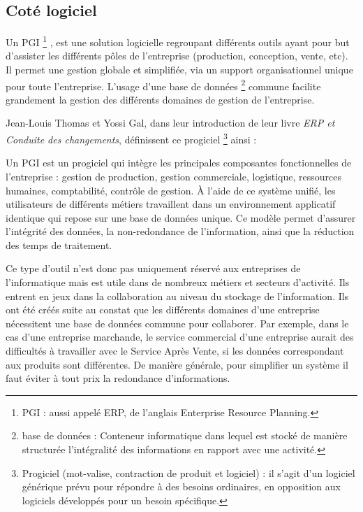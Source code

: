 \subsection{Coté logiciel}

Un \gls{PGI} \footnote{PGI : aussi appelé ERP, de l'anglais Enterprise Resource Planning.} , est une solution logicielle regroupant différents outils ayant pour but d'assister les différents pôles de l'entreprise (production, conception, vente, etc). Il permet une gestion globale et simplifiée, via un support organisationnel unique pour toute l'entreprise. L'usage d'une base de données \footnote{base de données : Conteneur informatique dans lequel est stocké de manière structurée l'intégralité des informations en rapport avec une activité.} commune facilite grandement la gestion des différents domaines de gestion de l'entreprise.

Jean-Louis Thomas et Yossi Gal, dans leur introduction de leur livre \textit{ERP et Conduite des changements}, définissent ce progiciel \footnote{Progiciel (mot-valise, contraction de produit et logiciel) : il s'agit d'un logiciel  générique prévu pour répondre à des besoins ordinaires, en opposition aux logiciels développés pour un besoin spécifique.} ainsi :

\begin{Quote}
Un PGI est un progiciel qui intègre les principales composantes fonctionnelles de l'entreprise : gestion de production, gestion commerciale, logistique, ressources humaines, comptabilité, contrôle de gestion.
À l'aide de ce système unifié, les utilisateurs de différents métiers travaillent dans un environnement applicatif identique qui repose sur une base de données unique. Ce modèle permet d'assurer l'intégrité des données, la non-redondance de l'information, ainsi que la réduction des temps de traitement.
\end{Quote}


Ce type d'outil n'est donc pas uniquement réservé aux entreprises de l'informatique mais est utile dans de nombreux métiers et secteurs d'activité. Ils entrent en jeux dans la collaboration au niveau du stockage de l'information. Ils ont été créés suite au constat que les différents domaines d'une entreprise nécessitent une base de données commune pour collaborer. Par exemple, dans le cas d'une entreprise marchande, le service commercial d'une entreprise aurait des difficultés à travailler avec le Service Après Vente, si les données correspondant aux produits sont différentes. De manière générale, pour simplifier un système il faut éviter à tout prix la redondance d'informations.


